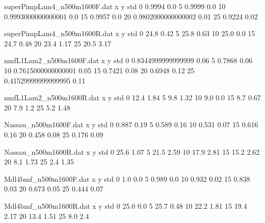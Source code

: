 \begin{filecontents}{superPimpLam4_n500m1600F.dat}
x y std
0 0.9994 0.0
5 0.9999 0.0
10 0.9993000000000001 0.0
15 0.9957 0.0
20 0.9802000000000002 0.01
25 0.9224 0.02
\end{filecontents}
\begin{filecontents}{superPimpLam4_n500m1600R.dat}
x y std
0 24.8 0.42
5 25.8 0.63
10 25.0 0.0
15 24.7 0.48
20 23.4 1.17
25 20.5 3.17
\end{filecontents}
\begin{filecontents}{nmfL1Lam2_n500m1600F.dat}
x y std
0 0.8344999999999999 0.06
5 0.7868 0.06
10 0.7615000000000001 0.05
15 0.7421 0.08
20 0.6948 0.12
25 0.41529999999999995 0.11
\end{filecontents}
\begin{filecontents}{nmfL1Lam2_n500m1600R.dat}
x y std
0 12.4 1.84
5 9.8 1.32
10 9.0 0.0
15 8.7 0.67
20 7.9 1.2
25 5.2 1.48
\end{filecontents}
\begin{filecontents}{Nassau_n500m1600F.dat}
x y std
0 0.887 0.19
5 0.589 0.16
10 0.531 0.07
15 0.616 0.16
20 0.458 0.08
25 0.176 0.09
\end{filecontents}
\begin{filecontents}{Nassau_n500m1600R.dat}
x y std
0 25.6 1.07
5 21.5 2.59
10 17.9 2.81
15 15.2 2.62
20 8.1 1.73
25 2.4 1.35
\end{filecontents}
\begin{filecontents}{Mdl4bmf_n500m1600F.dat}
x y std
0 1.0 0.0
5 0.989 0.0
10 0.932 0.02
15 0.838 0.03
20 0.673 0.05
25 0.444 0.07
\end{filecontents}
\begin{filecontents}{Mdl4bmf_n500m1600R.dat}
x y std
0 25.0 0.0
5 25.7 0.48
10 22.2 1.81
15 19.4 2.17
20 13.4 1.51
25 8.0 2.4
\end{filecontents}
